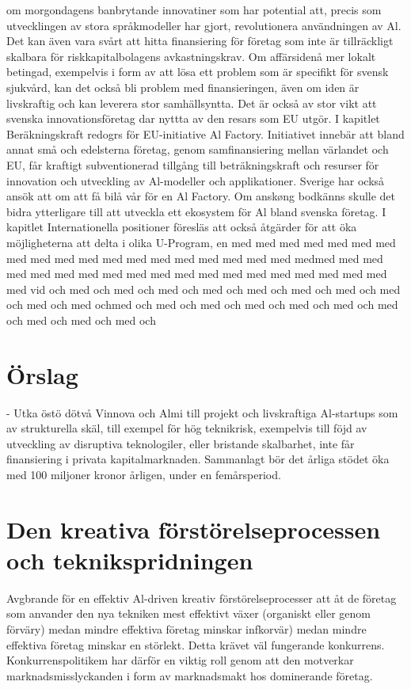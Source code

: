 {{{{{{{{{{{{{om morgondagens banbrytande innovatiner som har potential att, precis som utvecklingen av stora språkmodeller har gjort, revolutionera användningen av Al. Det kan även vara svårt att hitta finansiering för företag som inte är tillräckligt skalbara för riskkapitalbolagens avkastningskrav. Om affärsidenå mer lokalt betingad, exempelvis i form av att lösa ett problem som är specifikt för svensk sjukvård, kan det också bli problem med finansieringen, även om iden är livskraftig och kan leverera stor samhällsyntta.
Det är också av stor vikt att svenska innovationsföretag dar nyttta av den resars som EU utgör. I kapitlet Beräkningskraft redogrs för EU-initiative Al Factory. Initiativet innebär att bland annat små och edelsterna företag, genom samfinansiering mellan värlandet och EU, får kraftigt subventionerad tillgång till beträkningskraft och resurser för innovation och utveckling av Al-modeller och applikationer. Sverige har också ansök att om att få bilå vår för en Al Factory. Om anskøng bodkänns skulle det bidra ytterligare till att utveckla ett ekosystem för Al bland svenska företag. I kapitlet Internationella positioner föresläs att också åtgärder för att öka möjligheterna att delta i olika U-Program, en med med med med med med med med med med med med med med med med med med med medmed med med med med med med med med med med med med med med med med med med med vid och med och med och med och med och med och med och med och med och med och med ochmed och med och med och med och med och med och med och med och med och med och
\section*{Örslag}
- Utka östö dötvå Vinnova och Almi till projekt och livskraftiga Al-startups som av strukturella skäl, till exempel för hög teknikrisk, exempelvis till föjd av utveckling av disruptiva teknologiler, eller bristande skalbarhet, inte får finansiering i privata kapitalmarknaden. Sammanlagt bör det årliga stödet öka med 100 miljoner kronor årligen, under en femårsperiod.
\section*{Den kreativa förstörelseprocessen och teknikspridningen}
Avgbrande för en effektiv Al-driven kreativ förstörelseprocesser att åt de företag som anvander den nya tekniken mest effektivt växer (organiskt eller genom förväry) medan mindre effektiva företag minskar infkorvär) medan mindre effektiva företag minskar en störlekt. Detta krävet väl fungerande konkurrens. Konkurrenspolitikem har därför en viktig roll genom att den motverkar marknadsmisslyckanden i form av marknadsmakt hos dominerande företag.

}}}}}}}}}}}}}
